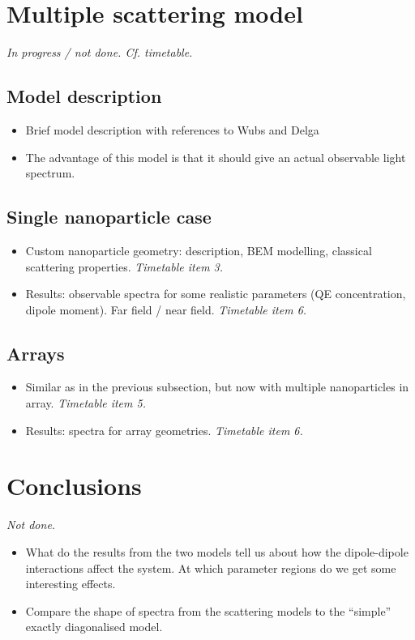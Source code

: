 \documentclass[pra,superscriptaddress,twocolumn,notitlepage,showpacs]{revtex4-1}
\begin{document}
\section*{Multiple scattering model}

\emph{In progress / not done. Cf. timetable.}


\subsection*{Model description}
\begin{itemize}
\item Brief model description with references to Wubs and Delga
\item The advantage of this model is that it should give an actual observable
light spectrum.
\end{itemize}

\subsection*{Single nanoparticle case}
\begin{itemize}
\item Custom nanoparticle geometry: description, BEM modelling, classical
scattering properties.\emph{ Timetable item 3. }
\item Results: observable spectra for some realistic parameters (QE concentration,
dipole moment). Far field / near field. \emph{Timetable item 6.}
\end{itemize}

\subsection*{Arrays}
\begin{itemize}
\item Similar as in the previous subsection, but now with multiple nanoparticles
in array. \emph{Timetable item 5.}
\item Results: spectra for array geometries. \emph{Timetable item 6.}
\end{itemize}

\section*{Conclusions}

\emph{Not done.}
\begin{itemize}
\item What do the results from the two models tell us about how the dipole-dipole
interactions affect the system. At which parameter regions do we get
some interesting effects.
\item Compare the shape of spectra from the scattering models to the ``simple''
exactly diagonalised model.\end{itemize}

%


\begin{thebibliography}{31}
\end{thebibliography}
\end{document}
